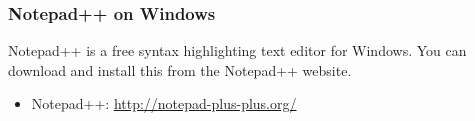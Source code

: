 
\subsubsection{Notepad++ on Windows} %
\label{ssub:notepad_for_windows}

Notepad++ is a free syntax highlighting text editor for Windows. You can download and install this from the Notepad++ website.

\begin{itemize}
  \item Notepad++: \url{http://notepad-plus-plus.org/}
\end{itemize}


